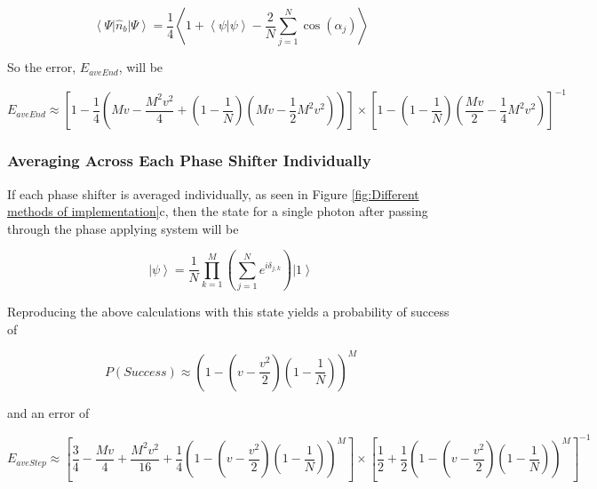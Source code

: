 \documentclass[aps,pra,twocolumn,superscriptaddress,numerical]{revtex4-1}
\begin{document}
		\begin{equation}
		\left\langle \Psi\right|\hat{n}_{b}\left|\Psi\right\rangle = \frac{1}{4}\left\langle 1+\left\langle \psi|\psi\right\rangle -\frac{2}{N}\sum_{j=1}^{N}\cos\left(\alpha_{j}\right)\right\rangle 
		\end{equation}
		
		
		So the error, $E_{aveEnd}$, will be
		
		\begin{widetext}
			\begin{equation}
			E_{aveEnd}  \approx  \left[1-\frac{1}{4}\left(Mv-\frac{M^{2}v^{2}}{4}+\left(1-\frac{1}{N}\right)\left(Mv-\frac{1}{2}M^{2}v^{2}\right)\right)\right]\nonumber\times\left[1-\left(1-\frac{1}{N}\right)\left(\frac{Mv}{2}-\frac{1}{4}M^{2}v^{2}\right)\right]^{-1}\label{eq:ErrorAvEnd}
			\end{equation}
		\end{widetext}
		
		
		\subsubsection{Averaging Across Each Phase Shifter Individually\label{Averaging Across Each Phase Shifter Individually}}
		
		If each phase shifter is averaged individually, as seen in Figure \ref{fig:Different methods of implementation}c, then the state for a single photon after passing through the phase applying system will be
		
		\begin{equation}
		\left|\psi\right\rangle =\frac{1}{N}\prod_{k=1}^{M}\left(\sum_{j=1}^{N}e^{i\delta_{j,k}}\right)\left|1\right\rangle \label{eq:AveStepPhaseState}
		\end{equation}
		
		
		Reproducing the above calculations with this state yields a probability of success of
		
		\begin{equation}
		P\left(Success\right)\approx\left(1-\left(v-\frac{v^{2}}{2}\right)\left(1-\frac{1}{N}\right)\right)^{M}\label{eq:AvStepProbSuccess}
		\end{equation}
		
		
		and an error of
		
		\begin{widetext}
			\begin{equation}
			E_{aveStep} \approx  \left[\frac{3}{4}-\frac{Mv}{4}+\frac{M^{2}v^{2}}{16}+\frac{1}{4}\left(1-\left(v-\frac{v^{2}}{2}\right)\left(1-\frac{1}{N}\right)\right)^{M}\right]\nonumber\times\left[\frac{1}{2}+\frac{1}{2}\left(1-\left(v-\frac{v^{2}}{2}\right)\left(1-\frac{1}{N}\right)\right)^{M}\right]^{-1}\label{eq:ErrorAvStep}
			\end{equation}
		\end{widetext}	
		
\end{document}
